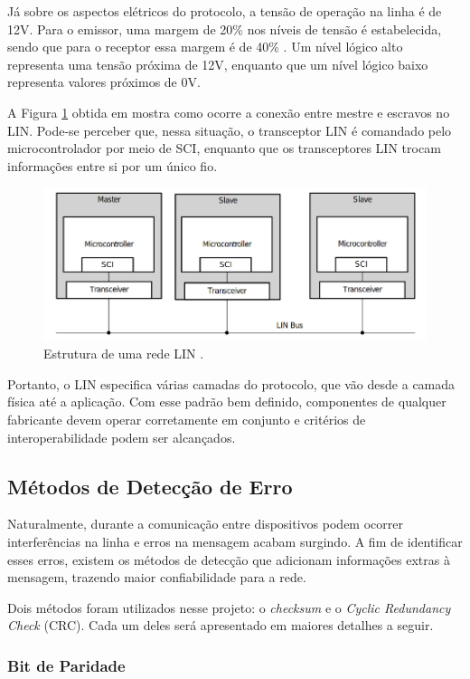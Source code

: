 Já sobre os aspectos elétricos do protocolo, a tensão de operação na linha é de 12V. Para o emissor, uma margem de 20\% nos níveis de tensão é estabelecida, sendo que para o receptor essa margem é de 40\% \cite{ti2018lin}. Um nível lógico alto representa uma tensão próxima de 12V, enquanto que um nível lógico baixo representa valores próximos de 0V.

A Figura \ref{fig:linconect} obtida em \cite{ti2018lin} mostra como ocorre a conexão entre mestre e escravos no LIN. Pode-se perceber que, nessa situação, o transceptor LIN é comandado pelo microcontrolador por meio de SCI, enquanto que os transceptores LIN trocam informações entre si por um único fio.

\begin{figure}[htb]
    \centering
    \includegraphics[width=.5\textwidth]{../figs/linconect}
    \caption{Estrutura de uma rede LIN \cite{ti2018lin}.}
    \label{fig:linconect}
\end{figure}

Portanto, o LIN especifica várias camadas do protocolo, que vão desde a camada física até a aplicação. Com esse padrão bem definido, componentes de qualquer fabricante devem operar corretamente em conjunto e critérios de interoperabilidade podem ser alcançados.

\subsection{Métodos de Detecção de Erro}
\label{fund:erros}

Naturalmente, durante a comunicação entre dispositivos podem ocorrer interferências na linha e erros na mensagem acabam surgindo. A fim de identificar esses erros, existem os métodos de detecção que adicionam informações extras à mensagem, trazendo maior confiabilidade para a rede.

Dois métodos foram utilizados nesse projeto: o \textit{checksum} e o \textit{Cyclic Redundancy Check} (CRC). Cada um deles será apresentado em maiores detalhes a seguir.

\subsubsection{Bit de Paridade}

